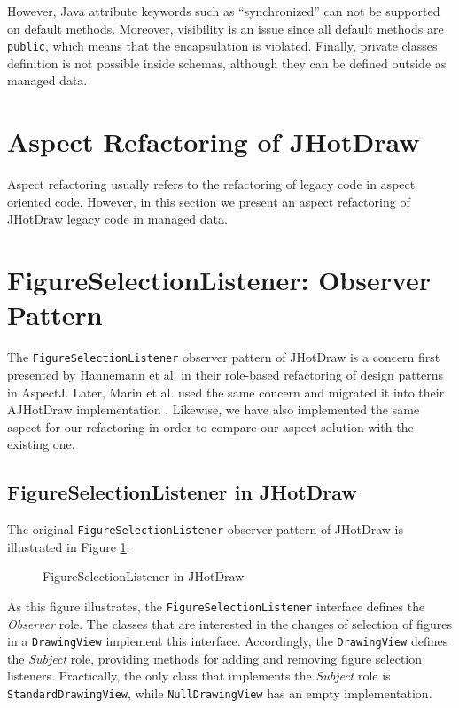 However, Java attribute keywords such as ``synchronized'' can not be supported on default methods.
Moreover, visibility is an issue since all default methods are \texttt{public}, which means that the encapsulation is violated.
Finally, private classes definition is not possible inside schemas, although they can be defined outside as managed data.

\section{Aspect Refactoring of JHotDraw}
Aspect refactoring usually refers to the refactoring of legacy code in aspect oriented code. 
However, in this section we present an aspect refactoring of JHotDraw legacy code in managed data.

\section{FigureSelectionListener: Observer Pattern}
The \texttt{FigureSelectionListener} observer pattern of JHotDraw is a concern first presented by Hannemann et al. \cite{hannemann2005role} in their role-based refactoring of design patterns in AspectJ. 
Later, Marin et al. used the same concern and migrated it into their AJHotDraw implementation \cite{marin2005approach}.
Likewise, we have also implemented the same aspect for our refactoring in order to compare our aspect solution with the existing one.

\subsection{FigureSelectionListener in JHotDraw}
The original \texttt{FigureSelectionListener} observer pattern of JHotDraw is illustrated in Figure \ref{fig:JHotDraw_FigureSelectionListener_OOP}.

\begin{figure}[H]
	\centering
  	\caption{FigureSelectionListener in JHotDraw}
  	\label{fig:JHotDraw_FigureSelectionListener_OOP}
\end{figure}

As this figure illustrates, the \texttt{FigureSelectionListener} interface defines the \textit{Observer} role.
The classes that are interested in the changes of selection of figures in a \texttt{DrawingView} implement this interface.
Accordingly, the \texttt{DrawingView} defines the \textit{Subject} role, providing methods for adding and removing figure selection listeners.
Practically, the only class that implements the \textit{Subject} role is \texttt{StandardDrawingView}, while \texttt{NullDrawingView} has an empty implementation.

